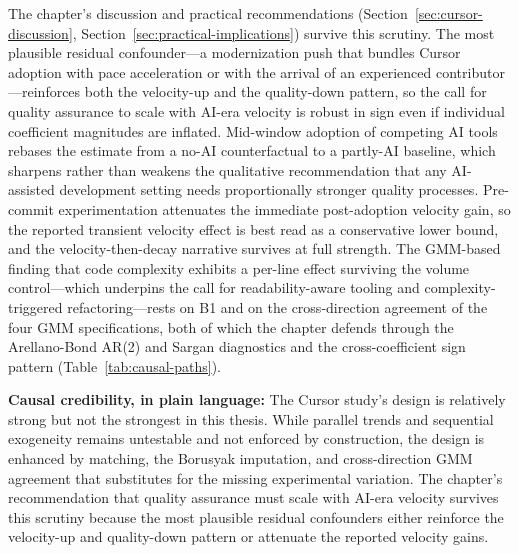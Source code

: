The chapter's discussion and practical recommendations (Section~\ref{sec:cursor-discussion}, Section~\ref{sec:practical-implications}) survive this scrutiny.
The most plausible residual confounder---a modernization push that bundles Cursor adoption with pace acceleration or with the arrival of an experienced contributor---reinforces both the velocity-up and the quality-down pattern, so the call for quality assurance to scale with AI-era velocity is robust in sign even if individual coefficient magnitudes are inflated.
Mid-window adoption of competing AI tools rebases the estimate from a no-AI counterfactual to a partly-AI baseline, which sharpens rather than weakens the qualitative recommendation that any AI-assisted development setting needs proportionally stronger quality processes.
Pre-commit experimentation attenuates the immediate post-adoption velocity gain, so the reported transient velocity effect is best read as a conservative lower bound, and the velocity-then-decay narrative survives at full strength.
The GMM-based finding that code complexity exhibits a per-line effect surviving the volume control---which underpins the call for readability-aware tooling and complexity-triggered refactoring---rests on B1 and on the cross-direction agreement of the four GMM specifications, both of which the chapter defends through the Arellano-Bond AR(2) and Sargan diagnostics and the cross-coefficient sign pattern (Table~\ref{tab:causal-paths}).

\begin{summary-rq}
\textbf{Causal credibility, in plain language:} The Cursor study's design is relatively strong but not the strongest in this thesis.
While parallel trends and sequential exogeneity remains untestable and not enforced by construction, the design is enhanced by matching, the Borusyak imputation, and cross-direction GMM agreement that substitutes for the missing experimental variation.
The chapter's recommendation that quality assurance must scale with AI-era velocity survives this scrutiny because the most plausible residual confounders either reinforce the velocity-up and quality-down pattern or attenuate the reported velocity gains.
\end{summary-rq}
